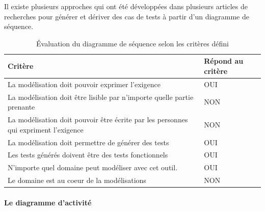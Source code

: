         Il existe plusieurs approches qui ont été développées dans plusieurs articles de recherches pour générer et dériver des cas de tests à partir d'un diagramme de séquence.~\cite{article8, article9}

        \begin{table}[H]
        \centering
         \begin{tabular}{|p{25em}|p{5em}|} 
         \hline
        Critère & Répond au critère \\ [0.5ex] 
         \hline
         La modélisation doit pouvoir exprimer l’exigence & \cellcolor[HTML]{699A73}OUI\\
         \hline
        La modélisation doit être lisible par n’importe quelle partie prenante & \cellcolor[HTML]{D03737}NON\\
         \hline
        La modélisation doit pouvoir être écrite par les personnes qui expriment l’exigence &\cellcolor[HTML]{D03737} NON \\
         \hline
        La modélisation doit permettre de générer des tests & \cellcolor[HTML]{699A73}OUI \\
         \hline
        Les tests générés doivent être des tests fonctionnels &\cellcolor[HTML]{699A73} OUI\\ 
         \hline
        N’importe quel domaine peut modéliser avec cet outil.&\cellcolor[HTML]{699A73} OUI\\ 
         \hline
        Le domaine est au coeur de la modélisations &\cellcolor[HTML]{D03737} NON\\ 
        \hline 
        \end{tabular}
        \caption{Évaluation du diagramme de séquence selon les critères défini}
        \end{table}
    
        \paragraph{Le diagramme d'activité}

